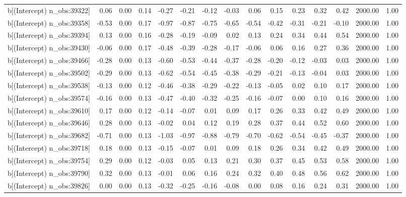\begin{table}[ht]
\begin{tabular}{rrrrrrrrrrrrrrr}
  b[(Intercept) n\_obs:39322] & 0.06 & 0.00 & 0.14 & -0.27 & -0.21 & -0.12 & -0.03 & 0.06 & 0.15 & 0.23 & 0.32 & 0.42 & 2000.00 & 1.00 \\ 
  b[(Intercept) n\_obs:39358] & -0.53 & 0.00 & 0.17 & -0.97 & -0.87 & -0.75 & -0.65 & -0.54 & -0.42 & -0.31 & -0.21 & -0.10 & 2000.00 & 1.00 \\ 
  b[(Intercept) n\_obs:39394] & 0.13 & 0.00 & 0.16 & -0.28 & -0.19 & -0.09 & 0.02 & 0.13 & 0.24 & 0.34 & 0.44 & 0.54 & 2000.00 & 1.00 \\ 
  b[(Intercept) n\_obs:39430] & -0.06 & 0.00 & 0.17 & -0.48 & -0.39 & -0.28 & -0.17 & -0.06 & 0.06 & 0.16 & 0.27 & 0.36 & 2000.00 & 1.00 \\ 
  b[(Intercept) n\_obs:39466] & -0.28 & 0.00 & 0.13 & -0.60 & -0.53 & -0.44 & -0.37 & -0.28 & -0.20 & -0.12 & -0.03 & 0.03 & 2000.00 & 1.00 \\ 
  b[(Intercept) n\_obs:39502] & -0.29 & 0.00 & 0.13 & -0.62 & -0.54 & -0.45 & -0.38 & -0.29 & -0.21 & -0.13 & -0.04 & 0.03 & 2000.00 & 1.00 \\ 
  b[(Intercept) n\_obs:39538] & -0.13 & 0.00 & 0.12 & -0.46 & -0.38 & -0.29 & -0.22 & -0.13 & -0.05 & 0.02 & 0.10 & 0.17 & 2000.00 & 1.00 \\ 
  b[(Intercept) n\_obs:39574] & -0.16 & 0.00 & 0.13 & -0.47 & -0.40 & -0.32 & -0.25 & -0.16 & -0.07 & 0.00 & 0.10 & 0.16 & 2000.00 & 1.00 \\ 
  b[(Intercept) n\_obs:39610] & 0.17 & 0.00 & 0.12 & -0.14 & -0.07 & 0.01 & 0.09 & 0.17 & 0.26 & 0.33 & 0.42 & 0.49 & 2000.00 & 1.00 \\ 
  b[(Intercept) n\_obs:39646] & 0.28 & 0.00 & 0.13 & -0.02 & 0.04 & 0.12 & 0.19 & 0.28 & 0.37 & 0.44 & 0.52 & 0.60 & 2000.00 & 1.00 \\ 
  b[(Intercept) n\_obs:39682] & -0.71 & 0.00 & 0.13 & -1.03 & -0.97 & -0.88 & -0.79 & -0.70 & -0.62 & -0.54 & -0.45 & -0.37 & 2000.00 & 1.00 \\ 
  b[(Intercept) n\_obs:39718] & 0.18 & 0.00 & 0.13 & -0.15 & -0.07 & 0.01 & 0.09 & 0.18 & 0.26 & 0.34 & 0.42 & 0.49 & 2000.00 & 1.00 \\ 
  b[(Intercept) n\_obs:39754] & 0.29 & 0.00 & 0.12 & -0.03 & 0.05 & 0.13 & 0.21 & 0.30 & 0.37 & 0.45 & 0.53 & 0.58 & 2000.00 & 1.00 \\ 
  b[(Intercept) n\_obs:39790] & 0.32 & 0.00 & 0.13 & -0.01 & 0.06 & 0.16 & 0.24 & 0.32 & 0.40 & 0.48 & 0.56 & 0.62 & 2000.00 & 1.00 \\ 
  b[(Intercept) n\_obs:39826] & 0.00 & 0.00 & 0.13 & -0.32 & -0.25 & -0.16 & -0.08 & 0.00 & 0.08 & 0.16 & 0.24 & 0.31 & 2000.00 & 1.00 \\ 

\end{tabular}
\end{table}
